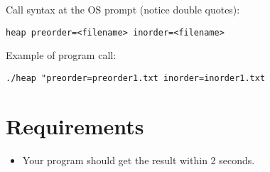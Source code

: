 \documentclass[times,11pt,verbatim,js-singlespace]{article}  %
\begin{document}
Call syntax at the OS prompt (notice double quotes):
\begin{verbatim}
heap preorder=<filename> inorder=<filename>
\end{verbatim}

Example of program call:
\begin{verbatim}
./heap "preorder=preorder1.txt inorder=inorder1.txt
\end{verbatim}
\section{Requirements}
\begin{itemize}
\item Your program should get the result within 2 seconds.
\end{itemize}
\end{document}

